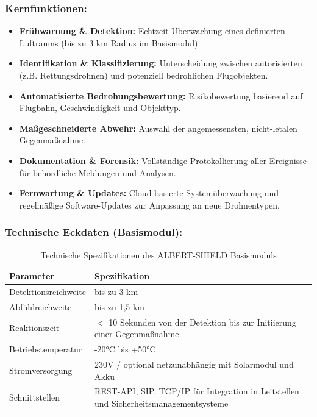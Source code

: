 \documentclass[11pt,a4paper]{article}
\begin{document}
\subsubsection{Kernfunktionen:}
\begin{itemize}
    \item \textbf{Frühwarnung \& Detektion:} Echtzeit-Überwachung eines definierten Luftraums (bis zu 3 km Radius im Basismodul).
    \item \textbf{Identifikation \& Klassifizierung:} Unterscheidung zwischen autorisierten (z.B. Rettungsdrohnen) und potenziell bedrohlichen Flugobjekten.
    \item \textbf{Automatisierte Bedrohungsbewertung:} Risikobewertung basierend auf Flugbahn, Geschwindigkeit und Objekttyp.
    \item \textbf{Maßgeschneiderte Abwehr:} Auswahl der angemessensten, nicht-letalen Gegenmaßnahme.
    \item \textbf{Dokumentation \& Forensik:} Vollständige Protokollierung aller Ereignisse für behördliche Meldungen und Analysen.
    \item \textbf{Fernwartung \& Updates:} Cloud-basierte Systemüberwachung und regelmäßige Software-Updates zur Anpassung an neue Drohnentypen.
\end{itemize}

\subsubsection{Technische Eckdaten (Basismodul):}
\begin{table}[ht]
\centering
\begin{tabularx}{0.9\textwidth}{lY}
\toprule
\textbf{Parameter} & \textbf{Spezifikation} \\
\midrule
Detektionsreichweite & bis zu 3 km \\
Abfühlreichweite & bis zu 1,5 km \\
Reaktionszeit & $<$ 10 Sekunden von der Detektion bis zur Initiierung einer Gegenmaßnahme \\
Betriebstemperatur & -20°C bis +50°C \\
Stromversorgung & 230V / optional netzunabhängig mit Solarmodul und Akku \\
Schnittstellen & REST-API, SIP, TCP/IP für Integration in Leitstellen und Sicherheitsmanagementsysteme \\
\bottomrule
\end{tabularx}
\caption{Technische Spezifikationen des ALBERT-SHIELD Basismoduls}
\end{table}
\end{document}
